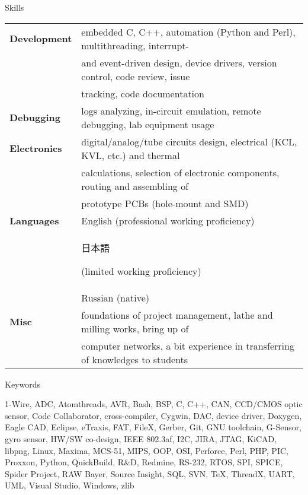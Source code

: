 \documentclass{template}
\begin{document}
\begin{rSection}{Skills}

\begin{tabular}{ @{} >{\bfseries}l @{\hspace{6ex}} l }
Development & embedded C, C++, automation (Python and Perl), multithreading, interrupt- \\
            & and event-driven design, device drivers, version control, code review, issue \\
            &  tracking, code documentation \\
Debugging   & logs analyzing, in-circuit emulation, remote debugging, lab equipment usage \\
Electronics & digital/analog/tube circuits design, electrical (KCL, KVL, etc.) and thermal \\
            & calculations, selection of electronic components, routing and assembling of \\
            & prototype PCBs (hole-mount and SMD) \\
Languages   & English (professional working proficiency) \\
            & \begin{CJK}{UTF8}{min}日本語\end{CJK} (limited working proficiency) \\
            & Russian (native) \\
Misc        & foundations of project management, lathe and milling works, bring up of \\
            & computer networks, a bit experience in transferring of knowledges to students
\end{tabular}

\end{rSection}


\begin{rSection}{Keywords}

1-Wire, ADC, Atomthreads, AVR, Bash, BSP, C, C++, CAN, CCD/CMOS optic sensor, Code Collaborator, cross-compiler, Cygwin, DAC, device driver, Doxygen, Eagle CAD, Eclipse, eTraxis, FAT, FileX, Gerber, Git, GNU toolchain, G-Sensor, gyro sensor, HW/SW co-design, IEEE 802.3af, I2C, JIRA, JTAG, KiCAD, libpng, Linux, Maxima, MCS-51, MIPS, OOP, OSI, Perforce, Perl, PHP, PIC, Proxxon, Python, QuickBuild, R\&D, Redmine, RS-232, RTOS, SPI, SPICE, Spider Project, RAW Bayer, Source Insight, SQL, SVN, \TeX, ThreadX, UART, UML, Visual Studio, Windows, zlib

\end{rSection}
\end{document}
